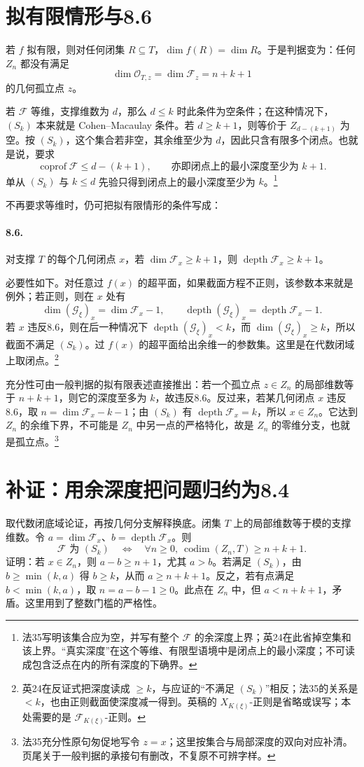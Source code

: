 \documentclass[openany,fontset=fandol]{ctexbook}
\DeclareMathOperator{\codim}{codim}
\DeclareMathOperator{\depth}{depth}
\DeclareMathOperator{\coprof}{coprof}
\newcommand{\F}{\mathcal F}
\newcommand{\G}{\mathcal G}
\begin{document}
\newpage
\section*{拟有限情形与8.6}
若 $f$ 拟有限，则对任何闭集 $R\subseteq T$，$\dim f(R)=\dim R$。于是判据变为：任何 $Z_n$ 都没有满足
\[
 \dim\mathcal O_{T,z}=\dim\F_z=n+k+1
\]
的几何孤立点 $z$。

若 $\F$ 等维，支撑维数为 $d$，那么 $d\le k$ 时此条件为空条件；在这种情况下，$(S_k)$ 本来就是 Cohen--Macaulay 条件。若 $d\ge k+1$，则等价于 $Z_{d-(k+1)}$ 为空。按 $(S_k)$，这个集合若非空，其余维至少为 $d$，因此只含有限多个闭点。也就是说，要求
\[
 \coprof\F\le d-(k+1),\qquad
 \text{亦即闭点上的最小深度至少为 } k+1.
\]
单从 $(S_k)$ 与 $k\le d$ 先验只得到闭点上的最小深度至少为 $k$。\footnote{法35写明该集合应为空，并写有整个 $\F$ 的余深度上界；英24在此省掉空集和该上界。“真实深度”在这个等维、有限型语境中是闭点上的最小深度；不可读成包含泛点在内的所有深度的下确界。}

不再要求等维时，仍可把拟有限情形的条件写成：

\paragraph{8.6.}
对支撑 $T$ 的每个几何闭点 $x$，若 $\dim\F_x\ge k+1$，则 $\depth\F_x\ge k+1$。

必要性如下。对任意过 $f(x)$ 的超平面，如果截面方程不正则，该参数本来就是例外；若正则，则在 $x$ 处有
\[
 \dim(\G_\xi)_x=\dim\F_x-1,\qquad
 \depth(\G_\xi)_x=\depth\F_x-1 .
\]
若 $x$ 违反8.6，则在后一种情况下 $\depth(\G_\xi)_x<k$，而 $\dim(\G_\xi)_x\ge k$，所以截面不满足 $(S_k)$。过 $f(x)$ 的超平面给出余维一的参数集。这里是在代数闭域上取闭点。\footnote{英24在反证式把深度读成 $\ge k$，与应证的“不满足 $(S_k)$”相反；法35的关系是 $<k$，也由正则截面使深度减一得到。英稿的 $X_{K(\xi)}$-正则是省略或误写；本处需要的是 $\F_{K(\xi)}$-正则。}

充分性可由一般判据的拟有限表述直接推出：若一个孤立点 $z\in Z_n$ 的局部维数等于 $n+k+1$，则它的深度至多为 $k$，故违反8.6。反过来，若某几何闭点 $x$ 违反8.6，取 $n=\dim\F_x-k-1$；由 $(S_k)$ 有 $\depth\F_x=k$，所以 $x\in Z_n$。它达到 $Z_n$ 的余维下界，不可能是 $Z_n$ 中另一点的严格特化，故是 $Z_n$ 的零维分支，也就是孤立点。\footnote{法35充分性原句匆促地写令 $z=x$；这里按集合与局部深度的双向对应补清。页尾关于一般判据的承接句有删改，不复原不可辨字样。}

\newpage
\section*{补证：用余深度把问题归约为8.4}
取代数闭底域论证，再按几何分支解释换底。闭集 $T$ 上的局部维数等于模的支撑维数。令 $a=\dim\F_x$、$b=\depth\F_x$。则
\[
 \F\text{ 为 }(S_k)
 \quad\Longleftrightarrow\quad
 \forall n\ge0,\ \codim(Z_n,T)\ge n+k+1.
\]
证明：若 $x\in Z_n$，则 $a-b\ge n+1$，尤其 $a>b$。若满足 $(S_k)$，由 $b\ge\min(k,a)$ 得 $b\ge k$，从而 $a\ge n+k+1$。反之，若有点满足 $b<\min(k,a)$，取 $n=a-b-1\ge0$。此点在 $Z_n$ 中，但 $a<n+k+1$，矛盾。这里用到了整数门槛的严格性。
\end{document}
